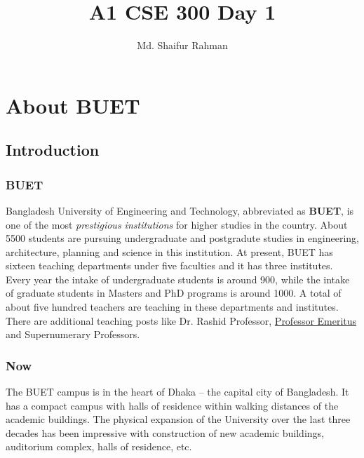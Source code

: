 \documentclass[a4paper,12pt,oneside]{article}
\title{A1 CSE 300 Day 1}
\author{Md. Shaifur Rahman}
\begin{document}
\maketitle
\newpage
\tableofcontents
\newpage
\section{About BUET}
\subsection{Introduction}
\label{xyz}
\subsubsection{BUET}	
Bangladesh University of Engineering and Technology, abbreviated as \textbf{BUET}, is one of the most \textit{prestigious institutions} for higher studies in the country. About 5500 students are pursuing undergraduate and postgradute studies in engineering, architecture, planning and science in this institution. At present, BUET has sixteen teaching departments under five faculties and it has three institutes. Every year the intake of undergraduate students is around 900, while the intake of graduate students in Masters and PhD programs is around 1000. A total of about five hundred teachers are teaching in these departments and institutes. There are additional teaching posts like Dr. Rashid Professor, \uline{Professor Emeritus} and Supernumerary Professors.
\subsubsection{Now}
\noindent The BUET campus is in the heart of Dhaka – the capital city of Bangladesh. It has a compact campus with halls of residence within walking distances of the academic buildings. The physical expansion of the University over the last three decades has been impressive with construction of new academic buildings, auditorium complex, halls of residence, etc.
\end{document}
